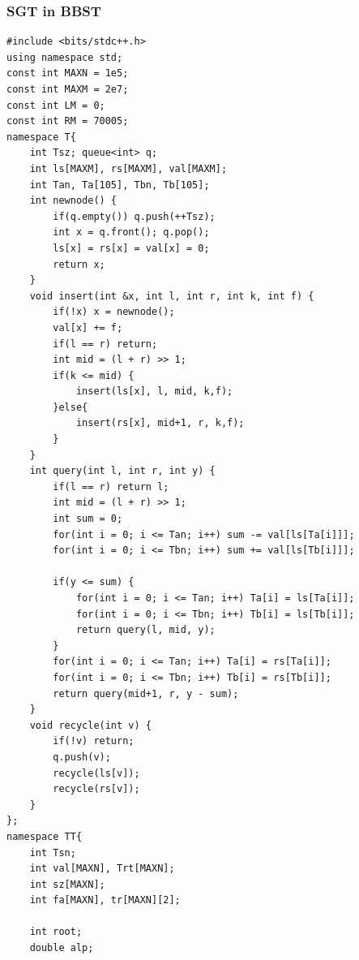 \documentclass[10pt]{ctexart}
\begin{document}
{\subsubsection{SGT in BBST}
\begin{lstlisting}
#include <bits/stdc++.h>
using namespace std;
const int MAXN = 1e5;
const int MAXM = 2e7;
const int LM = 0;
const int RM = 70005;
namespace T{
	int Tsz; queue<int> q;
	int ls[MAXM], rs[MAXM], val[MAXM];
	int Tan, Ta[105], Tbn, Tb[105];
	int newnode() {
		if(q.empty()) q.push(++Tsz);
		int x = q.front(); q.pop();
		ls[x] = rs[x] = val[x] = 0;
		return x;
	}
	void insert(int &x, int l, int r, int k, int f) {
		if(!x) x = newnode();
		val[x] += f;
		if(l == r) return;
		int mid = (l + r) >> 1;
		if(k <= mid) {
			insert(ls[x], l, mid, k,f);
		}else{
			insert(rs[x], mid+1, r, k,f);
		}
	}
	int query(int l, int r, int y) {
		if(l == r) return l;
		int mid = (l + r) >> 1;
		int sum = 0;
		for(int i = 0; i <= Tan; i++) sum -= val[ls[Ta[i]]];
		for(int i = 0; i <= Tbn; i++) sum += val[ls[Tb[i]]];

		if(y <= sum) {
			for(int i = 0; i <= Tan; i++) Ta[i] = ls[Ta[i]];
			for(int i = 0; i <= Tbn; i++) Tb[i] = ls[Tb[i]];
			return query(l, mid, y);
		}
		for(int i = 0; i <= Tan; i++) Ta[i] = rs[Ta[i]];
		for(int i = 0; i <= Tbn; i++) Tb[i] = rs[Tb[i]];
		return query(mid+1, r, y - sum);
	}
	void recycle(int v) {
		if(!v) return;
		q.push(v);
		recycle(ls[v]);
		recycle(rs[v]);
	}
};
namespace TT{
	int Tsn;
	int val[MAXN], Trt[MAXN]; 
	int sz[MAXN];
	int fa[MAXN], tr[MAXN][2];
	
	int root;
	double alp;
	

\end{lstlisting}}
\end{document}
